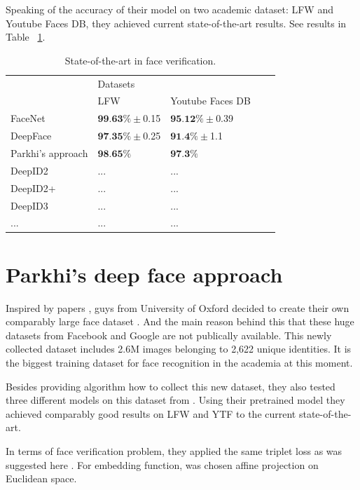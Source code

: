 \documentclass[paper=a4, fontsize=11pt]{scrartcl} %
\numberwithin{equation}{section} %
\numberwithin{figure}{section} %
\numberwithin{table}{section} %
\begin{document}
Speaking of the accuracy of their model on two academic dataset: LFW and Youtube Faces DB, they achieved current state-of-the-art results. See results in Table ~\ref{tab:table2}.

\begin{table}[!htb]
\centering
\begin{tabular}{|l|l|l|l|l|}
\hline
\multirow{2}{*}{} Models & \multicolumn{2}{l|}{Datasets} \\ \cline{2-3} 
                  &   LFW  &  Youtube Faces DB        \\ \hline
               FaceNet   &  $\textbf{99.63}\% \pm$0.15   &   $\textbf{95.12}\% \pm$0.39       \\ \hline
               DeepFace &  $\textbf{97.35}\% \pm$0.25   &  $\textbf{91.4}\% \pm$1.1       \\ \hline
               Parkhi's approach		& $\textbf{98.65}\%$	 & $\textbf{97.3}\%$ \\ \hline
               DeepID2 &  ...   &  ...       \\ \hline
               DeepID2+ &  ...   &  ...       \\ \hline
               DeepID3 &  ...   &  ...       \\ \hline
               ... & ... & ... \\ \hline
\end{tabular}
\caption{State-of-the-art in face verification.}
\label{tab:table2}
\end{table}

\section{Parkhi's deep face approach}

Inspired by papers \cite{taigman2014deepface, schroff2015facenet}, guys from University of Oxford decided to create their own comparably large face dataset \cite{parkhi2015deep}. And the main reason behind this that these huge datasets from Facebook and Google are not publically available. This newly collected dataset includes 2.6M images belonging to 2,622 unique identities. It is the biggest training dataset for face recognition in the academia at this moment. \par
Besides providing algorithm how to collect this new dataset, they also tested three different models on this dataset from \cite{simonyan2014very}. Using their pretrained model they achieved comparably good results on LFW and YTF to the current state-of-the-art.\par
In terms of face verification problem, they applied the same triplet loss as was suggested here \cite{schroff2015facenet}. For embedding function, was chosen affine projection on Euclidean space.
\end{document}
